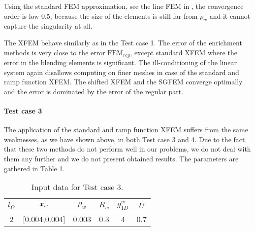 Using the standard FEM approximation, see the line FEM in , the convergence order is low 0.5,
because the size of the elements is still far from $\rho_w$ and it cannot capture the singularity at all.

The XFEM behave similarly as in the Test case 1. The error of the enrichment methods is very close to the error $\textrm{FEM}_{reg}$,
except standard XFEM where the error in the blending elements is significant. The ill-conditioning of the linear system again 
disallows computing on finer meshes in case of the standard and ramp function XFEM.
The shifted XFEM and the SGFEM converge optimally and the error is dominated by the error of the regular part.


\paragraph{Test case 3}
The application of the standard and ramp function XFEM suffers from the same weaknesses, as we have shown above, in both Test case 3 and 4.
Due to the fact that these two methods do not perform well in our problems, we do not deal with them any further
and we do not present obtained results.
The parameters are gathered in Table \ref{tab:test_case_3_data}.
%
\begin{table}[!htb]
\begin{center}
\begin{tabular}{cccccc}
\toprule
$l_\Omega$ & $\mathbf{\boldsymbol{x}}_w$  & $\rho_w$ & $R_w$ & $g^w_{1D}$ & $U$ \\
\midrule
2 & [0.004,0.004] & 0.003 & 0.3 & 4 & 0.7\\
\bottomrule
\end{tabular}
\caption{Input data for Test case 3.}
\label{tab:test_case_3_data}
\end{center}
\end{table}
%

